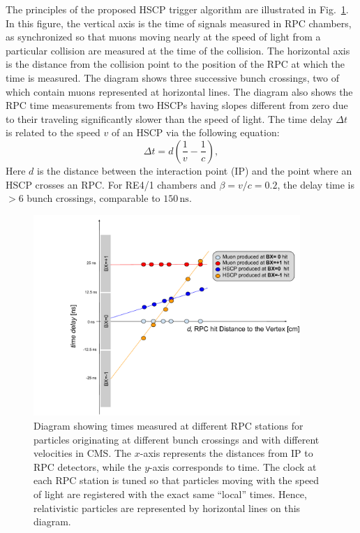 The principles of the proposed HSCP trigger algorithm are illustrated in Fig.~\ref{fig:HSCP_diagram}. In this figure, the vertical axis is the time of signals measured in RPC chambers, as synchronized so that muons moving nearly at the speed of light from a particular collision are measured at the time of the collision. The horizontal axis is the distance from the collision point to the position of the RPC at which the time is measured. The diagram shows three successive bunch crossings, two of which contain muons represented at horizontal lines. The diagram also shows the RPC time measurements from two HSCPs having slopes different from zero due to their traveling significantly slower than the speed of light. The time delay $\Delta t$ is related to the speed $v$ of an HSCP via the following equation:
%
\begin{equation}
\label{eq:HSCP_delay}
\Delta t = d\left(\frac{1}{v}-\frac{1}{c}\right),
\end{equation}
%
Here $d$ is the distance between the interaction point (IP) and the point where an HSCP crosses an RPC. For RE4/1 chambers and $\beta = v/c = 0.2$, the delay time is $>6$ bunch crossings, comparable to $150 \, \mathrm{ns}$.

\begin{figure}[t]
  \centering
  \includegraphics[width=0.9\textwidth]{figures/HSCP/diagram.pdf}
  \caption{Diagram showing times measured at different RPC stations for particles originating at different bunch crossings and with different velocities in CMS. The $x$-axis represents the distances from IP to RPC detectors, while the $y$-axis corresponds to time. The clock at each RPC station is tuned so that particles moving with the speed of light are registered with the exact same ``local'' times. Hence, relativistic particles are represented by horizontal lines on this diagram.}
  \label{fig:HSCP_diagram}
\end{figure}

